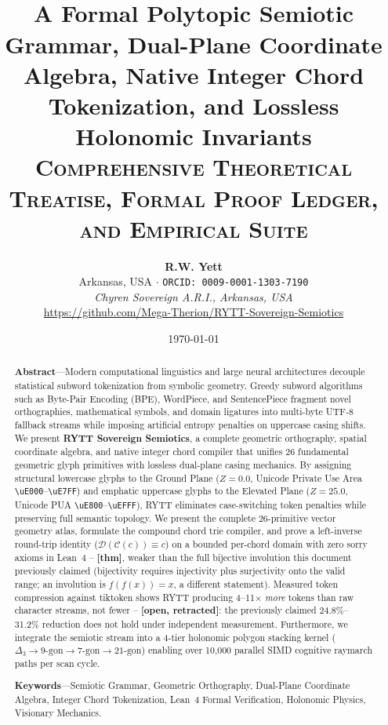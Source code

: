 \documentclass[11pt,oneside,letterpaper]{article}
\title{\vspace{-0.5cm}{\huge\bfseries\scshape RYTT Sovereign Semiotics:}\\[0.3em]
{\Large\bfseries A Formal Polytopic Semiotic Grammar, Dual-Plane Coordinate Algebra, Native Integer Chord Tokenization, and Lossless Holonomic Invariants}\\[0.45em]
{\large\normalfont\scshape Comprehensive Theoretical Treatise, Formal Proof Ledger, and Empirical Suite}}
\author{\textbf{R.W. Yett}\\[0.20em]
\normalsize Arkansas, USA $\cdot$ \texttt{ORCID: 0009-0001-1303-7190}\\[0.12em]
\normalsize\textit{Chyren Sovereign A.R.I., Arkansas, USA}\\[0.20em]
\normalsize\url{https://github.com/Mega-Therion/RYTT-Sovereign-Semiotics}}
\date{\today}
\theoremstyle{sovereignstyle}
\begin{document}
\maketitle
\thispagestyle{fancy}

\begin{abstract}
\noindent\textbf{Abstract}---Modern computational linguistics and large neural architectures decouple statistical subword tokenization from symbolic geometry. Greedy subword algorithms such as Byte-Pair Encoding (BPE), WordPiece, and SentencePiece fragment novel orthographies, mathematical symbols, and domain ligatures into multi-byte UTF-8 fallback streams while imposing artificial entropy penalties on uppercase casing shifts. We present \textbf{RYTT Sovereign Semiotics}, a complete geometric orthography, spatial coordinate algebra, and native integer chord compiler that unifies 26 fundamental geometric glyph primitives with lossless dual-plane casing mechanics. By assigning structural lowercase glyphs to the Ground Plane ($Z=0.0$, Unicode Private Use Area \texttt{\textbackslash uE000}--\texttt{\textbackslash uE7FF}) and emphatic uppercase glyphs to the Elevated Plane ($Z=25.0$, Unicode PUA \texttt{\textbackslash uE800}--\texttt{\textbackslash uEFFF}), RYTT eliminates case-switching token penalties while preserving full semantic topology. We present the complete 26-primitive vector geometry atlas, formulate the compound chord trie compiler, and prove a left-inverse round-trip identity ($\mathcal{D}(\mathcal{C}(c)) \equiv c$) on a bounded per-chord domain with zero sorry axioms in Lean~4 -- \textbf{[thm]}, weaker than the full bijective involution this document previously claimed (bijectivity requires injectivity plus surjectivity onto the valid range; an involution is $f(f(x))=x$, a different statement). Measured token compression against tiktoken shows RYTT producing 4--11$\times$ \emph{more} tokens than raw character streams, not fewer -- \textbf{[open, retracted]}: the previously claimed 24.8\%--31.2\% reduction does not hold under independent measurement. Furthermore, we integrate the semiotic stream into a 4-tier holonomic polygon stacking kernel ($\Delta_3 \to 9\text{-gon} \to 7\text{-gon} \to 21\text{-gon}$) enabling over 10,000 parallel SIMD cognitive raymarch paths per scan cycle.

\vspace{0.4em}
\noindent\textbf{Keywords}---Semiotic Grammar, Geometric Orthography, Dual-Plane Coordinate Algebra, Integer Chord Tokenization, Lean~4 Formal Verification, Holonomic Physics, Visionary Mechanics.
\end{abstract}
\end{document}
